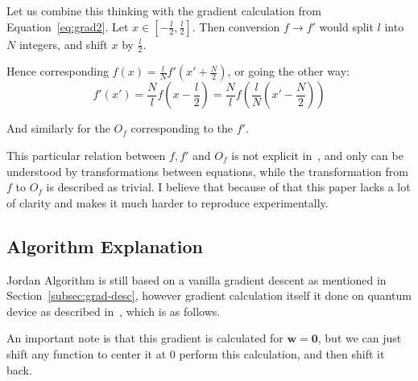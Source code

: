 \documentclass{article}
\begin{document}
Let us combine this thinking with the gradient calculation from Equation~\ref{eq:grad2}. Let $x \in [-\frac{l}{2}, \frac{l}{2}]$.
Then conversion $f \rightarrow f'$ would split $l$ into $N$ integers, and shift $x$ by $\frac{l}{2}$.

Hence corresponding $f(x) = \frac{l}{N}f'(x' + \frac{N}{2})$, or going the other way:
\begin{equation}
    \label{eq:func-conversion}
    f'(x') = \frac{N}{l}f(x - \frac{l}{2}) = \frac{N}{l}f(\frac{l}{N}(x' - \frac{N}{2}))
\end{equation}

And similarly for the $O_f$ corresponding to the $f'$.

This particular relation between $f, f'$ and $O_f$ is not explicit in~\cite{Jordan_2005},
and only can be understood by transformations between equations, while the transformation from $f$ to $O_f$ is described as trivial.
I believe that because of that this paper lacks a lot of clarity and makes it much harder to reproduce experimentally.

\subsection{Algorithm Explanation}
\label{subsec:jord-expl}
Jordan Algorithm is still based on a vanilla gradient descent as mentioned in Section~\ref{subsec:grad-desc},
however gradient calculation itself it done on quantum device as described in~\cite{Jordan_2005}, which is as follows.

An important note is that this gradient is calculated for $\pmb{w} = \pmb{0}$, but we can just shift any function to center it at $0$ perform this calculation, and then shift it back.
\end{document}
